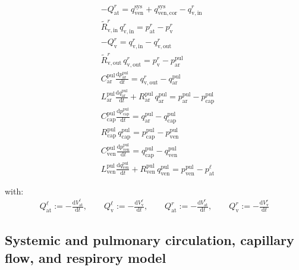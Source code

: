 \documentclass[a4paper,12pt]{report}
\begin{document}
\begin{align}
&-Q_{\mathrm{at}}^{r} = q_{\mathrm{ven}}^{\mathrm{sys}} + q_{\mathrm{ven,cor}}^{\mathrm{sys}} - q_{\mathrm{v,in}}^{r}\nonumber\\
&\tilde{R}_{\mathrm{v,in}}^{r}\,q_{\mathrm{v,in}}^{r} = p_{\mathrm{at}}^{r}-p_{\mathrm{v}}^{r}\nonumber\\
&-Q_{\mathrm{v}}^{r} = q_{\mathrm{v,in}}^{r} - q_{\mathrm{v,out}}^{r}\nonumber\\
&\tilde{R}_{\mathrm{v,out}}^{r}\,q_{\mathrm{v,out}}^{r} = p_{\mathrm{v}}^{r}-p_{\mathrm{ar}}^{\mathrm{pul}}\nonumber\\
&C_{\mathrm{ar}}^{\mathrm{pul}} \frac{\mathrm{d}p_{\mathrm{ar}}^{\mathrm{pul}}}{\mathrm{d}t} = q_{\mathrm{v,out}}^{r} - q_{\mathrm{ar}}^{\mathrm{pul}}\nonumber\\
&L_{\mathrm{ar}}^{\mathrm{pul}}\frac{\mathrm{d}q_{\mathrm{ar}}^{\mathrm{pul}}}{\mathrm{d}t} + R_{\mathrm{ar}}^{\mathrm{pul}}\,q_{\mathrm{ar}}^{\mathrm{pul}}=p_{\mathrm{ar}}^{\mathrm{pul}} -p_{\mathrm{cap}}^{\mathrm{pul}}\nonumber\\
&C_{\mathrm{cap}}^{\mathrm{pul}} \frac{\mathrm{d}p_{\mathrm{cap}}^{\mathrm{pul}}}{\mathrm{d}t} = q_{\mathrm{ar}}^{\mathrm{pul}} - q_{\mathrm{cap}}^{\mathrm{pul}}\nonumber\\
&R_{\mathrm{cap}}^{\mathrm{pul}}\,q_{\mathrm{cap}}^{\mathrm{pul}}=p_{\mathrm{cap}}^{\mathrm{pul}}-p_{\mathrm{ven}}^{\mathrm{pul}}\nonumber\\
&C_{\mathrm{ven}}^{\mathrm{pul}} \frac{\mathrm{d}p_{\mathrm{ven}}^{\mathrm{pul}}}{\mathrm{d}t} = q_{\mathrm{cap}}^{\mathrm{pul}} - q_{\mathrm{ven}}^{\mathrm{pul}}\nonumber\\
&L_{\mathrm{ven}}^{\mathrm{pul}}\frac{\mathrm{d}q_{\mathrm{ven}}^{\mathrm{pul}}}{\mathrm{d}t} + R_{\mathrm{ven}}^{\mathrm{pul}}\, q_{\mathrm{ven}}^{\mathrm{pul}}=p_{\mathrm{ven}}^{\mathrm{pul}}-p_{\mathrm{at}}^{\ell}\nonumber
\end{align}

with:
\begin{align}
Q_{\mathrm{at}}^{\ell} := -\frac{\mathrm{d}V_{\mathrm{at}}^{\ell}}{\mathrm{d}t}, \qquad
Q_{\mathrm{v}}^{\ell} := -\frac{\mathrm{d}V_{\mathrm{v}}^{\ell}}{\mathrm{d}t}, \qquad
Q_{\mathrm{at}}^{r} := -\frac{\mathrm{d}V_{\mathrm{at}}^{r}}{\mathrm{d}t}, \qquad
Q_{\mathrm{v}}^{r} := -\frac{\mathrm{d}V_{\mathrm{v}}^{r}}{\mathrm{d}t} \nonumber
\end{align}

\subsection{Systemic and pulmonary circulation, capillary flow, and respirory model}
\end{document}
